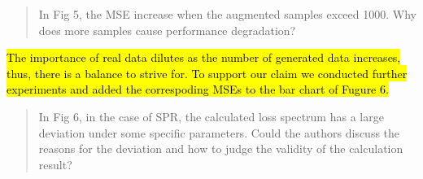 \documentclass{article}
\begin{document}
	\begin{quote}
	In Fig 5, the MSE increase when the augmented samples exceed 1000. Why does more samples cause performance degradation?
	\end{quote}
	
	\hl{The importance of real data dilutes as the number of generated data increases, thus, there is a balance to strive for. To support our claim we conducted further experiments and added the correspoding MSEs to the bar chart of Fugure 6.}
	
	\begin{quote}
	In Fig 6, in the case of SPR, the calculated loss spectrum has a large deviation under some specific parameters. Could the authors discuss the reasons for the deviation and how to judge the validity of the calculation result?
	\end{quote}
	
	
\end{document}
